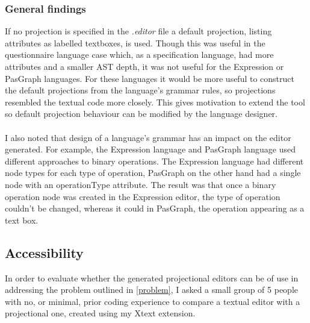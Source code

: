 \documentclass{article}
\begin{document}
{\subsubsection{General findings}
If no projection is specified in the \emph{.editor} file a default projection, listing attributes as labelled textboxes, is used. Though this was useful in the questionnaire language case which, as a specification language, had more attributes and a smaller AST depth, it was not useful for the Expression or PasGraph languages. For these languages it would be more useful to construct the default projections from the language's grammar rules, so projections resembled the textual code more closely. This gives motivation to extend the tool so default projection behaviour can be modified by the language designer.
\\
\\
I also noted that design of a language's grammar has an impact on the editor generated. For example, the Expression language and PasGraph language used different approaches to binary operations. The Expression language had different node types for each type of operation, PasGraph on the other hand had a single node with an operationType attribute. The result was that once a binary operation node was created in the Expression editor, the type of operation couldn't be changed, whereas it could in PasGraph, the operation appearing as a text box.

\subsection{Accessibility}\label{Accessibility}
In order to evaluate whether the generated projectional editors can be of use in addressing the problem outlined in \ref{problem}, I asked a small group of 5 people with no, or minimal, prior coding experience to compare a textual editor with a projectional one, created using my Xtext extension.

}
\end{document}
